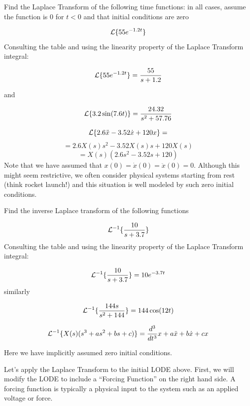 \begin{ExampleSmall}
Find the Laplace Transform of the following time functions:  in all cases, assume the function is $0$ for $t<0$ and that initial conditions are zero

\vspace{0.2in}

\[
\mathcal{L}\{55e^{-1.2t}\}
\]
Consulting the table and using the linearity property of the Laplace Transform integral:

\[
\mathcal{L}\{55e^{-1.2t}\} = \frac {55} {s+1.2}
\]

\vspace{0.2in}
and

\[
\mathcal{L}\{ 3.2\sin(7.6t) \} = \frac {24.32}{s^2 + 57.76}
\]
\vspace{0.2in}


\[
\mathcal{L}\{ 2.6\ddot{x} - 3.52\dot{x} + 120x \} =
\]
\[
= 2.6X(s)s^2-3.52X(s)s+120X(s)
\]
\[
= X(s) \left(2.6s^2 - 3.52s + 120 \right)
\]
Note that we have assumed that $x(0) = \dot{x}(0) = \ddot{x}(0) = 0$.   Although this might seem restrictive, we often consider physical systems starting from rest (think rocket launch!) and this situation is well modeled by such zero initial conditions.
\end{ExampleSmall}


\begin{ExampleSmall}
Find the inverse Laplace transform of the following functions

\vspace{0.2in}

\[
\mathcal{L}^{-1}\{\frac{10}{s+3.7}  \}
\]
Consulting the table and using the linearity property of the Laplace Transform integral:


\[
\mathcal{L}^{-1}\{\frac{10}{s+3.7}  \}  = 10e^{-3.7t}
\]
\vspace{0.2in}
similarly

\[
\mathcal{L}^{-1}\{ \frac{144s}{s^2 + 144} \}  = 144\cos(12t)
\]

\vspace{0.2in}


\[
\mathcal{L}^{-1}\{ X(s)(s^3 + as^2 + bs+c) \} = \frac{d^3}{dt^3}x + a\ddot{x} + b\dot{x} + cx
\]

Here we have implicitly assumed zero initial conditions.

\end{ExampleSmall}


Let's apply the Laplace Transform to the initial LODE above.  First, we will modify the LODE to include a ``Forcing Function'' on the right hand side.  A forcing function is typically a physical input to the system such as an applied voltage or force.

